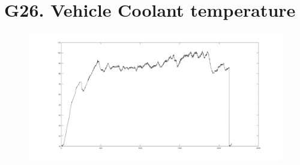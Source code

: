 \documentclass{article}
\begin{document}
\section*{G26. Vehicle Coolant temperature }
\begin{figure}[h!]
 \begin{center}
 \advance\leftskip-6cm
  \includegraphics[width=230mm,scale=0.7]{g26s1.jpg}
\end{center}
\end{figure}
\end{document}
